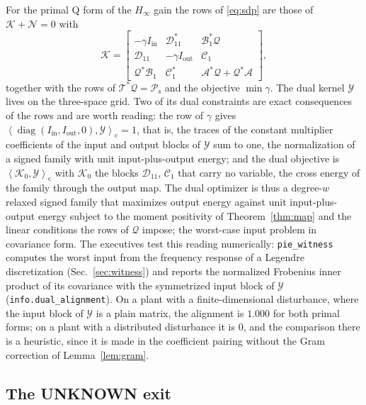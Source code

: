 \documentclass[12pt]{article}
\newcommand{\mcl}[1]{\mathcal{#1}}
\newcommand{\mrm}[1]{\mathrm{#1}}
\newcommand{\bmat}[1]{\begin{bmatrix} #1 \end{bmatrix}}
\newcommand{\ipc}[2]{\left\langle #1,#2\right\rangle_{\mrm{c}}}
\newcommand{\code}[1]{\texttt{#1}}
\DeclareMathOperator{\diag}{diag}
\theoremstyle{plain}
\theoremstyle{definition}
\theoremstyle{remark}
\begin{document}
For the primal Q form of the $H_\infty$ gain the rows of \eqref{eq:sdp} are those of $\mcl K+\mcl N=0$ with
\[
\mcl K=\bmat{-\gamma I_{\mrm{in}}&\mcl D_{11}^*&\mcl B_1^*\mcl Q\\ \mcl D_{11}&-\gamma I_{\mrm{out}}&\mcl C_1\\ \mcl Q^*\mcl B_1&\mcl C_1^*&\mcl A^*\mcl Q+\mcl Q^*\mcl A},
\]
together with the rows of $\mcl T^*\mcl Q=\mcl P_{\mrm s}$ and the objective $\min\gamma$. The dual kernel $\mcl Y$ lives on the three-space grid. Two of its dual constraints are exact consequences of the rows and are worth reading: the row of $\gamma$ gives $\ipc{\diag(I_{\mrm{in}},I_{\mrm{out}},0)}{\mcl Y}=1$, that is, the traces of the constant multiplier coefficients of the input and output blocks of $\mcl Y$ sum to one, the normalization of a signed family with unit input-plus-output energy; and the dual objective is $\ipc{\mcl K_0}{\mcl Y}$ with $\mcl K_0$ the blocks $\mcl D_{11}$, $\mcl C_1$ that carry no variable, the cross energy of the family through the output map. The dual optimizer is thus a degree-$w$ relaxed signed family that maximizes output energy against unit input-plus-output energy subject to the moment positivity of Theorem~\ref{thm:map} and the linear conditions the rows of $\mcl Q$ impose; the worst-case input problem in covariance form. The executives test this reading numerically: \code{pie\_witness} computes the worst input from the frequency response of a Legendre discretization (Sec.~\ref{sec:witness}) and reports the normalized Frobenius inner product of its covariance with the symmetrized input block of $\mcl Y$ (\code{info.dual\_alignment}). On a plant with a finite-dimensional disturbance, where the input block of $\mcl Y$ is a plain matrix, the alignment is $1.000$ for both primal forms; on a plant with a distributed disturbance it is $0$, and the comparison there is a heuristic, since it is made in the coefficient pairing without the Gram correction of Lemma~\ref{lem:gram}.

\subsection{The UNKNOWN exit}\label{sec:unknown}
\end{document}
